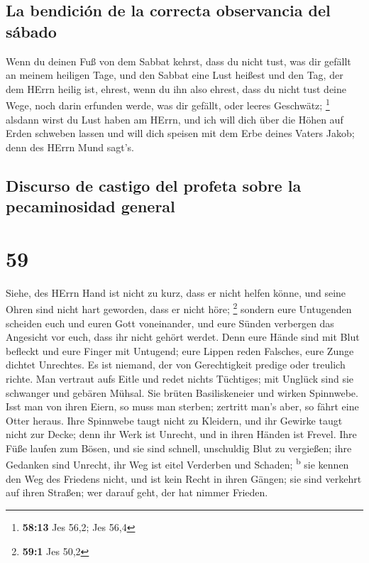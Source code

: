\hypertarget{la-bendiciuxf3n-de-la-correcta-observancia-del-suxe1bado}{%
\subsection{La bendición de la correcta observancia del
sábado}\label{la-bendiciuxf3n-de-la-correcta-observancia-del-suxe1bado}}

 Wenn du deinen Fuß von dem Sabbat kehrst, dass du nicht
tust, was dir gefällt an meinem heiligen Tage, und den Sabbat eine Lust
heißest und den Tag, der dem HErrn heilig ist, ehrest, wenn du ihn also
ehrest, dass du nicht tust deine Wege, noch darin erfunden werde, was
dir gefällt, oder leeres Geschwätz; \footnote{\textbf{58:13} Jes 56,2;
  Jes 56,4}  alsdann wirst du Lust haben am HErrn, und
ich will dich über die Höhen auf Erden schweben lassen und will dich
speisen mit dem Erbe deines Vaters Jakob; denn des HErrn Mund sagt's.

\hypertarget{discurso-de-castigo-del-profeta-sobre-la-pecaminosidad-general}{%
\subsection{Discurso de castigo del profeta sobre la pecaminosidad
general}\label{discurso-de-castigo-del-profeta-sobre-la-pecaminosidad-general}}

\hypertarget{section-58}{%
\section{59}\label{section-58}}

 Siehe, des HErrn Hand ist nicht zu kurz, dass er nicht
helfen könne, und seine Ohren sind nicht hart geworden, dass er nicht
höre; \footnote{\textbf{59:1} Jes 50,2}  sondern eure
Untugenden scheiden euch und euren Gott voneinander, und eure Sünden
verbergen das Angesicht vor euch, dass ihr nicht gehört werdet.
 Denn eure Hände sind mit Blut befleckt und eure Finger
mit Untugend; eure Lippen reden Falsches, eure Zunge dichtet Unrechtes.
 Es ist niemand, der von Gerechtigkeit predige oder
treulich richte. Man vertraut aufs Eitle und redet nichts Tüchtiges; mit
Unglück sind sie schwanger und gebären Mühsal.  Sie brüten
Basiliskeneier und wirken Spinnwebe. Isst man von ihren Eiern, so muss
man sterben; zertritt man's aber, so fährt eine Otter heraus.
 Ihre Spinnwebe taugt nicht zu Kleidern, und ihr Gewirke
taugt nicht zur Decke; denn ihr Werk ist Unrecht, und in ihren Händen
ist Frevel.  Ihre Füße laufen zum Bösen, und sie sind
schnell, unschuldig Blut zu vergießen; ihre Gedanken sind Unrecht, ihr
Weg ist eitel Verderben und Schaden; \textsuperscript{b} 
sie kennen den Weg des Friedens nicht, und ist kein Recht in ihren
Gängen; sie sind verkehrt auf ihren Straßen; wer darauf geht, der hat
nimmer Frieden.

